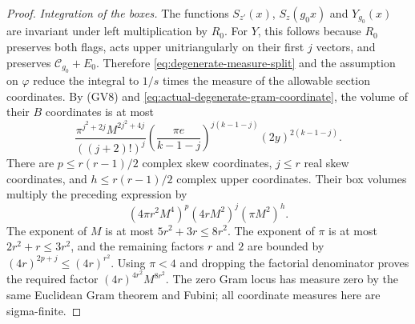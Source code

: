 \begin{proof}
\emph{Integration of the boxes.}
The functions $S_{z'}(x)$, $S_z(g_0x)$ and $Y_{g_0}(x)$
are invariant under left multiplication by $R_0$.
For $Y$, this follows because $R_0$ preserves both flags,
acts upper unitriangularly on their first $j$ vectors, and
preserves $\mathcal C_{g_0}+E_0$.  Therefore
\eqref{eq:degenerate-measure-split} and the assumption on
$\varphi$ reduce the integral to $1/s$ times the measure
of the allowable section coordinates.
By (GV8) and \eqref{eq:actual-degenerate-gram-coordinate}, the
volume of their $B$ coordinates is at most
\[
 \frac{\pi^{j^2+2j}M^{2j^2+4j}}{((j+2)!)^j}
       \left(\frac{\pi e}{k-1-j}\right)^{j(k-1-j)}
                             (2y)^{2(k-1-j)}.
\]
There are $p\le r(r-1)/2$ complex skew coordinates,
$j\le r$ real skew coordinates, and
$h\le r(r-1)/2$ complex upper coordinates.  Their box
volumes multiply the preceding expression by
\[
             (4\pi r^2M^4)^p(4rM^2)^j(\pi M^2)^h.
\]
The exponent of $M$ is at most $5r^2+3r\le8r^2$.
The exponent of $\pi$ is at most $2r^2+r\le3r^2$,
and the remaining factors $r$ and $2$ are bounded by
$(4r)^{2p+j}\le(4r)^{r^2}$.  Using $\pi<4$ and dropping
the factorial denominator proves the required factor
$(4r)^{4r^2}M^{8r^2}$.  The zero Gram locus has measure
zero by the same Euclidean Gram theorem and Fubini; all
coordinate measures here are sigma-finite.


\end{proof}

